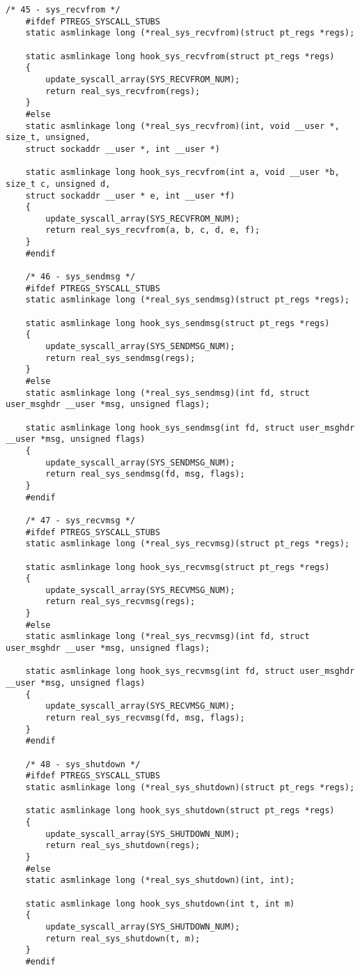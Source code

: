 \begin{lstlisting}[caption={листинг файла hooks.c}]
	/* 45 - sys_recvfrom */
	#ifdef PTREGS_SYSCALL_STUBS
	static asmlinkage long (*real_sys_recvfrom)(struct pt_regs *regs);
	
	static asmlinkage long hook_sys_recvfrom(struct pt_regs *regs)
	{
		update_syscall_array(SYS_RECVFROM_NUM);
		return real_sys_recvfrom(regs);
	}
	#else
	static asmlinkage long (*real_sys_recvfrom)(int, void __user *, size_t, unsigned,
	struct sockaddr __user *, int __user *)
	
	static asmlinkage long hook_sys_recvfrom(int a, void __user *b, size_t c, unsigned d,
	struct sockaddr __user * e, int __user *f)
	{
		update_syscall_array(SYS_RECVFROM_NUM);
		return real_sys_recvfrom(a, b, c, d, e, f);
	}
	#endif
	
	/* 46 - sys_sendmsg */
	#ifdef PTREGS_SYSCALL_STUBS
	static asmlinkage long (*real_sys_sendmsg)(struct pt_regs *regs);
	
	static asmlinkage long hook_sys_sendmsg(struct pt_regs *regs)
	{
		update_syscall_array(SYS_SENDMSG_NUM);
		return real_sys_sendmsg(regs);
	}
	#else
	static asmlinkage long (*real_sys_sendmsg)(int fd, struct user_msghdr __user *msg, unsigned flags);
	
	static asmlinkage long hook_sys_sendmsg(int fd, struct user_msghdr __user *msg, unsigned flags)
	{
		update_syscall_array(SYS_SENDMSG_NUM);
		return real_sys_sendmsg(fd, msg, flags);
	}
	#endif
	
	/* 47 - sys_recvmsg */
	#ifdef PTREGS_SYSCALL_STUBS
	static asmlinkage long (*real_sys_recvmsg)(struct pt_regs *regs);
	
	static asmlinkage long hook_sys_recvmsg(struct pt_regs *regs)
	{
		update_syscall_array(SYS_RECVMSG_NUM);
		return real_sys_recvmsg(regs);
	}
	#else
	static asmlinkage long (*real_sys_recvmsg)(int fd, struct user_msghdr __user *msg, unsigned flags);
	
	static asmlinkage long hook_sys_recvmsg(int fd, struct user_msghdr __user *msg, unsigned flags)
	{
		update_syscall_array(SYS_RECVMSG_NUM);
		return real_sys_recvmsg(fd, msg, flags);
	}
	#endif
	
	/* 48 - sys_shutdown */
	#ifdef PTREGS_SYSCALL_STUBS
	static asmlinkage long (*real_sys_shutdown)(struct pt_regs *regs);
	
	static asmlinkage long hook_sys_shutdown(struct pt_regs *regs)
	{
		update_syscall_array(SYS_SHUTDOWN_NUM);
		return real_sys_shutdown(regs);
	}
	#else
	static asmlinkage long (*real_sys_shutdown)(int, int);
	
	static asmlinkage long hook_sys_shutdown(int t, int m)
	{
		update_syscall_array(SYS_SHUTDOWN_NUM);
		return real_sys_shutdown(t, m);
	}
	#endif
	

\end{lstlisting}
